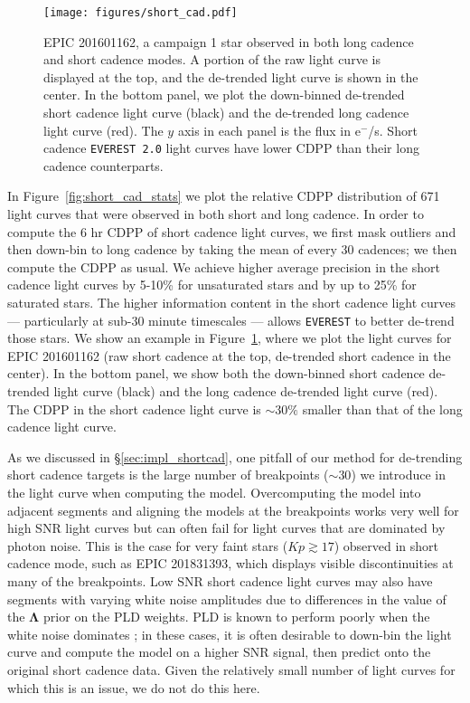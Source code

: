 \documentclass[]{emulateapj}
\newcommand{\Kp}{\ensuremath{Kp}}
\begin{document}
\begin{figure}[hbt]
  \begin{center}
      \texttt{[image: figures/short\_cad.pdf]}
       \caption{EPIC 201601162, a campaign 1 star observed in both long cadence and
       short cadence modes. A portion of the raw light curve is 
       displayed at the top, and the de-trended light curve is shown in the center. In the bottom panel,
       we plot the down-binned de-trended short cadence light curve (black) and the
       de-trended long cadence light curve (red). The $y$ axis in each panel is the flux
       in e$^{-}$/s.
       Short cadence \texttt{EVEREST 2.0}
       light curves have lower CDPP than their long cadence counterparts.}
     \label{fig:short_cad}
  \end{center}
\end{figure}

In Figure~\ref{fig:short_cad_stats} we plot the relative CDPP distribution of 
671 light curves that were observed in both short and long cadence. In order to
compute the 6 hr CDPP of short cadence light curves, we first mask outliers and then
down-bin to long cadence by taking the mean of every 30 cadences; we then compute
the CDPP as usual. We achieve higher average precision in the short cadence light
curves by 5-10\% for unsaturated stars and by up to 25\% for saturated stars. The
higher information content in the short cadence light curves --- particularly
at sub-30 minute timescales --- allows \texttt{EVEREST} to better de-trend those stars.
We show an example in Figure~\ref{fig:short_cad}, where we plot the light curves
for EPIC 201601162 (raw short cadence at the top, de-trended short cadence in the
center). In the bottom panel, we show both the down-binned short cadence de-trended light
curve (black) and the long cadence de-trended light curve (red). The CDPP in the short
cadence light curve is ${\sim}30\%$ smaller than that of the long cadence light curve.

As we discussed in \S\ref{sec:impl_shortcad}, one pitfall of our method for de-trending
short cadence targets is the large number of breakpoints (${\sim}30$) we introduce
in the light curve when computing the model. Overcomputing the model into adjacent
segments and aligning the models at the breakpoints works very well for high
SNR light curves but can often fail for light curves that are dominated by photon
noise. This is the case for very faint stars ($\Kp \gtrsim 17$) observed in
short cadence mode, such as EPIC 201831393, which displays visible discontinuities
at many of the breakpoints. Low SNR short cadence light curves may also have segments 
with varying white noise amplitudes due to differences in the value of the $\mathbf{\Lambda}$
prior on the PLD weights. PLD is known to perform poorly when the white noise dominates
\citep{Deming15}; in these cases, it is often desirable to down-bin the light curve and
compute the model on a higher SNR signal, then predict onto the original short cadence
data. Given the relatively small number of light curves for which this is an issue,
we do not do this here.
\end{document}
